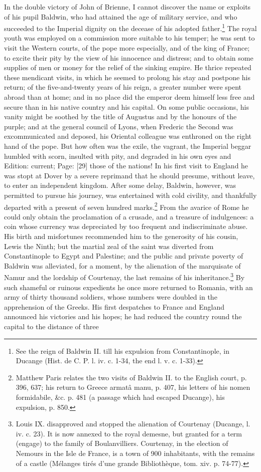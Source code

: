 In the double victory of John of Brienne, I cannot discover the name or exploits of his pupil Baldwin, who had attained the age of military service, and who succeeded to the Imperial dignity on the decease of his adopted father.\footnote{See the reign of Baldwin II. till his expulsion from Constantinople, in Ducange (Hist. de C. P. l. iv. c. 1-34, the end l. v. c. 1-33).} The royal youth was employed on a commission more suitable to his temper; he was sent to visit the Western courts, of the pope more especially, and of the king of France; to excite their pity by the view of his innocence and distress; and to obtain some supplies of men or money for the relief of the sinking empire. He thrice repeated these mendicant visits, in which he seemed to prolong his stay and postpone his return; of the five-and-twenty years of his reign, a greater number were spent abroad than at home; and in no place did the emperor deem himself less free and secure than in his native country and his capital. On some public occasions, his vanity might be soothed by the title of Augustus and by the honours of the purple; and at the general council of Lyons, when Frederic the Second was excommunicated and deposed, his Oriental colleague was enthroned on the right hand of the pope. But how often was the exile, the vagrant, the Imperial beggar humbled with scorn, insulted with pity, and degraded in his own eyes and Edition: current; Page: [29] those of the nations! In his first visit to England he was stopt at Dover by a severe reprimand that he should presume, without leave, to enter an independent kingdom. After some delay, Baldwin, however, was permitted to pursue his journey, was entertained with cold civility, and thankfully departed with a present of seven hundred marks.\footnote{Matthew Paris relates the two visits of Baldwin II. to the English court, p. 396, 637; his return to Greece armatâ manu, p. 407, his letters of his nomen formidabile, \&c. p. 481 (a passage which had escaped Ducange), his expulsion, p. 850.} From the avarice of Rome he could only obtain the proclamation of a crusade, and a treasure of indulgences: a coin whose currency was depreciated by too frequent and indiscriminate abuse. His birth and misfortunes recommended him to the generosity of his cousin, Lewis the Ninth; but the martial zeal of the saint was diverted from Constantinople to Egypt and Palestine; and the public and private poverty of Baldwin was alleviated, for a moment, by the alienation of the marquisate of Namur and the lordship of Courtenay, the last remains of his inheritance.\footnote{Louis IX. disapproved and stopped the alienation of Courtenay (Ducange, l. iv. c. 23). It is now annexed to the royal demesne, but granted for a term (engage) to the family of Boulanvilliers. Courtenay, in the election of Nemours in the Isle de France, is a town of 900 inhabitants, with the remains of a castle (Mélanges tirés d\texthebrew{}’une grande Bibliothèque, tom. xiv. p. 74-77).} By such shameful or ruinous expedients he once more returned to Romania, with an army of thirty thousand soldiers, whose numbers were doubled in the apprehension of the Greeks. His first despatches to France and England announced his victories and his hopes; he had reduced the country round the capital to the distance of three 